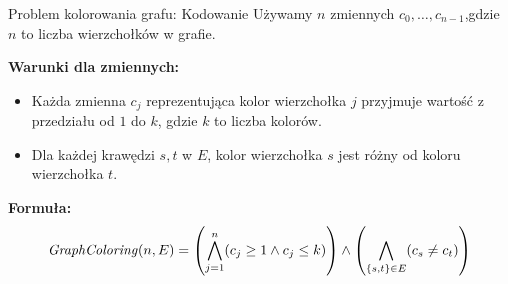 \begin{frame}{Problem kolorowania grafu: Kodowanie}
Używamy $n$ zmiennych $c_0,…,c_{n−1}$​,gdzie $n$ to liczba wierzchołków w grafie.
\vspace{10pt}

\textbf{Warunki dla zmiennych:}
\vspace{5pt}
\begin{itemize}
	\item Każda zmienna $c_j$ reprezentująca kolor wierzchołka $j$ przyjmuje wartość z przedziału od $1$ do $k$, gdzie $k$ to liczba kolorów.
	\item Dla każdej krawędzi $s,t$ w $E$, kolor wierzchołka $s$ jest różny od koloru wierzchołka $t$.
\end{itemize}
\vspace{10pt}

\textbf{Formuła:}
\begin{align*}
	{\mathit{GraphColoring}}(n, E) = \left( \bigwedge_{j=1}^{n} (c_j \geq 1 \land c_j \leq k) \right) \land 
	\left( \bigwedge_{\{s,t\} \in E} (c_s \neq c_t) \right)
\end{align*}	
\end{frame}